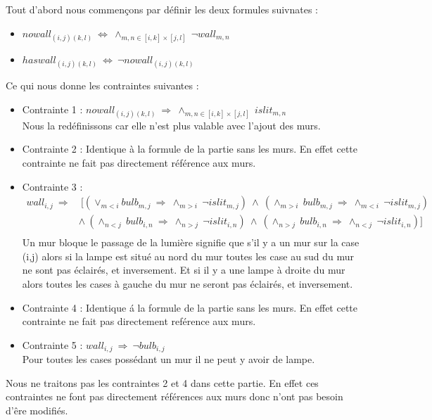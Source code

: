 \documentclass{article}
\begin{document}
Tout d'abord nous commençons par définir les deux formules suivnates :
\begin{itemize}
\item $ nowall_{(i,j)(k,l)} ~ \Leftrightarrow ~ \wedge_{m,n \in [i,k]\times[j,l]} ~ \neg wall_{m,n} $
\item $ haswall_{(i,j)(k,l)} ~ \Leftrightarrow ~ \neg nowall_{(i,j)(k,l)} $\\
\end{itemize}
Ce qui nous donne les contraintes suivantes :
\begin{itemize}
  
\item Contrainte 1 : $ nowall_{(i,j)(k,l)} ~ \Rightarrow ~ \wedge_{m,n \in [i,k]\times[j,l]} ~ islit_{m,n} $ \\
  Nous la redéfinissons car elle n'est plus valable avec l'ajout des murs. 
\item Contrainte 2 : Identique \`a la formule de la partie sans les murs. En effet cette contrainte ne fait pas directement réf\'erence aux murs.
\item Contrainte 3 :
\begin{align}
\nonumber
 wall_{i,j} ~ \Rightarrow &~ [(\vee_{m<i}bulb_{m,j} ~ \Rightarrow ~ \wedge_{m>i} ~ \neg islit_{m,j})~\wedge ~ (\wedge_{m>i} ~ bulb_{m,j} ~ \Rightarrow ~ \wedge_{m<i} ~ \neg islit_{m,j})\\
\nonumber
& \wedge ~ (\wedge_{n<j} ~ bulb_{i,n} ~ \Rightarrow ~ \wedge_{n>j} ~ \neg islit_{i,n})~ \wedge ~ (\wedge_{n>j} ~ bulb_{i,n} ~ \Rightarrow ~ \wedge_{n<j} ~ \neg islit_{i,n})]\\
\nonumber
\end{align}
Un mur bloque le passage de la lumière signifie que s'il y a un mur sur la case (i,j) alors si la lampe est situé au nord du mur toutes les case au sud du mur ne sont pas éclairés, et inversement. Et si il y a une lampe à droite du mur alors toutes les cases à gauche du mur ne seront pas éclairés, et inversement.
\item Contrainte 4 : Identique \'a la formule de la partie sans les murs. En effet cette contrainte ne fait pas directement ref\'erence aux murs.
\item Contrainte 5 : $ wall_{i,j}~\Rightarrow~\neg bulb_{i,j} $\\
  Pour toutes les cases possédant un mur il ne peut y avoir de lampe.
\end{itemize}
Nous ne traitons pas les contraintes 2 et 4 dans cette partie. En effet ces contraintes ne font pas directement réf\'erences aux murs donc n'ont pas besoin d'êre modifiés. 
\end{document}
